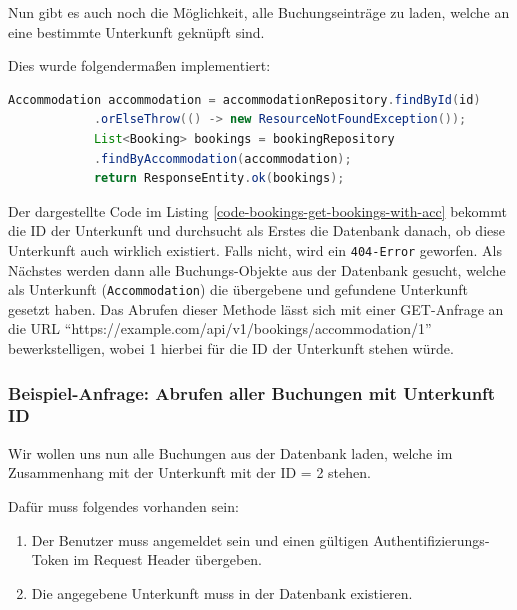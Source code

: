 		Nun gibt es auch noch die Möglichkeit, alle Buchungseinträge zu laden, welche an eine bestimmte Unterkunft geknüpft sind. 
		
		Dies wurde folgendermaßen implementiert:
		
		\begin{lstlisting}[caption={Aufrufen aller in der Datenbank gespeicherten Buchungen, welche mit der jeweiligen Unterkunft verknüpft sind.}, label={code-bookings-get-bookings-with-acc}, language=Java]
			Accommodation accommodation = accommodationRepository.findById(id)
			.orElseThrow(() -> new ResourceNotFoundException());
			List<Booking> bookings = bookingRepository
			.findByAccommodation(accommodation);
			return ResponseEntity.ok(bookings);
		\end{lstlisting}
		
		Der dargestellte Code im Listing \ref{code-bookings-get-bookings-with-acc} bekommt die ID der Unterkunft und durchsucht als Erstes die Datenbank danach, ob diese Unterkunft auch wirklich existiert. Falls nicht, wird ein \texttt{404-Error} geworfen.
		Als Nächstes werden dann alle Buchungs-Objekte aus der Datenbank gesucht, welche als Unterkunft (\texttt{Accommodation}) die übergebene und gefundene Unterkunft gesetzt haben.
		Das Abrufen dieser Methode lässt sich mit einer GET-Anfrage an die URL
		\enquote{https://example.com/api/v1/bookings/accommodation/1} bewerkstelligen, wobei 1 hierbei für die ID der Unterkunft stehen würde.
		
		\subsubsection{Beispiel-Anfrage: Abrufen aller Buchungen mit Unterkunft ID}
		
		Wir wollen uns nun alle Buchungen aus der Datenbank laden, welche im Zusammenhang mit der Unterkunft mit der ID = 2 stehen.
		
		Dafür muss folgendes vorhanden sein:
		
		\begin{enumerate}
			\item Der Benutzer muss angemeldet sein und einen gültigen Authentifizierungs-Token im Request Header übergeben.
			\item Die angegebene Unterkunft muss in der Datenbank existieren.
		\end{enumerate}
		
